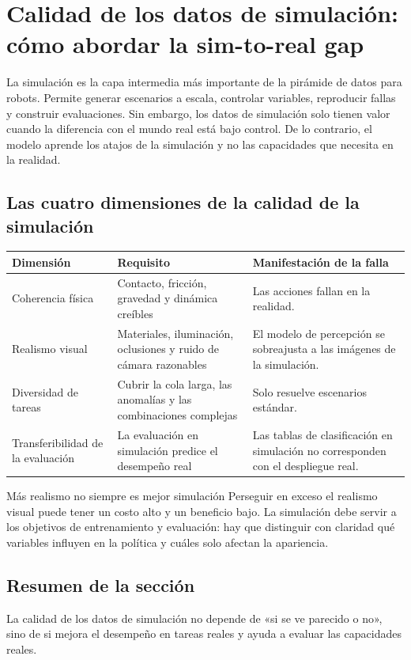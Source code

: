 \section{Calidad de los datos de simulación: cómo abordar la sim-to-real gap}

La simulación es la capa intermedia más importante de la pirámide de datos para robots. Permite generar escenarios a escala, controlar variables, reproducir fallas y construir evaluaciones. Sin embargo, los datos de simulación solo tienen valor cuando la diferencia con el mundo real está bajo control. De lo contrario, el modelo aprende los atajos de la simulación y no las capacidades que necesita en la realidad.

\subsection{Las cuatro dimensiones de la calidad de la simulación}

\noindent\begin{tabularx}{\textwidth}{p{}p{}X}
\toprule
Dimensión & Requisito & Manifestación de la falla \\
\midrule
Coherencia física & Contacto, fricción, gravedad y dinámica creíbles & Las acciones fallan en la realidad. \\
Realismo visual & Materiales, iluminación, oclusiones y ruido de cámara razonables & El modelo de percepción se sobreajusta a las imágenes de la simulación. \\
Diversidad de tareas & Cubrir la cola larga, las anomalías y las combinaciones complejas & Solo resuelve escenarios estándar. \\
Transferibilidad de la evaluación & La evaluación en simulación predice el desempeño real & Las tablas de clasificación en simulación no corresponden con el despliegue real. \\
\bottomrule
\end{tabularx}

\begin{warningbox}{Más realismo no siempre es mejor simulación}
Perseguir en exceso el realismo visual puede tener un costo alto y un beneficio bajo. La simulación debe servir a los objetivos de entrenamiento y evaluación: hay que distinguir con claridad qué variables influyen en la política y cuáles solo afectan la apariencia.
\end{warningbox}

\subsection{Resumen de la sección}

La calidad de los datos de simulación no depende de «si se ve parecido o no», sino de si mejora el desempeño en tareas reales y ayuda a evaluar las capacidades reales.
